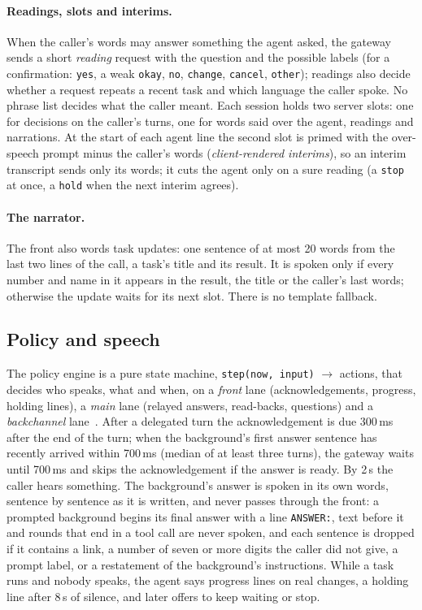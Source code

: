 \paragraph{Readings, slots and interims.}
When the caller's words may answer something the agent asked, the gateway sends a short \emph{reading} request with the
question and the possible labels (for a confirmation: \texttt{yes}, a weak \texttt{okay}, \texttt{no}, \texttt{change},
\texttt{cancel}, \texttt{other}); readings also decide whether a request repeats a recent task and which language the
caller spoke. No phrase list decides what the caller meant. Each session holds two server slots: one for decisions on the
caller's turns, one for words said over the agent, readings and narrations. At the start of each agent line the second
slot is primed with the over-speech prompt minus the caller's words (\emph{client-rendered interims}), so an interim
transcript sends only its words; it cuts the agent only on a sure reading (a \texttt{stop} at once, a \texttt{hold} when
the next interim agrees).

\paragraph{The narrator.}
The front also words task updates: one sentence of at most 20 words from the last two lines of the call, a task's title
and its result. It is spoken only if every number and name in it appears in the result, the title or the caller's last
words; otherwise the update waits for its next slot. There is no template fallback.

\subsection{Policy and speech}\label{sec:sys-policy}

The policy engine is a pure state machine, \texttt{step(now, input)} $\to$ actions, that decides who speaks, what and when,
on a \emph{front} lane (acknowledgements, progress, holding lines), a \emph{main} lane (relayed answers, read-backs,
questions) and a \emph{backchannel} lane~\citep{waav_design}. After a delegated turn the acknowledgement is due 300\,ms
after the end of the turn; when the background's first answer sentence has recently arrived within 700\,ms (median of at
least three turns), the gateway waits until 700\,ms and skips the acknowledgement if the answer is ready. By 2\,s the caller
hears something. The background's answer is spoken in its own words, sentence by sentence as it is written, and never passes
through the front: a prompted background begins its final answer with a line \texttt{ANSWER:}, text before it and rounds
that end in a tool call are never spoken, and each sentence is dropped if it contains a link, a number of seven or more
digits the caller did not give, a prompt label, or a restatement of the background's instructions. While a task runs and
nobody speaks, the agent says progress lines on real changes, a holding line after 8\,s of silence, and later offers to keep
waiting or stop.

